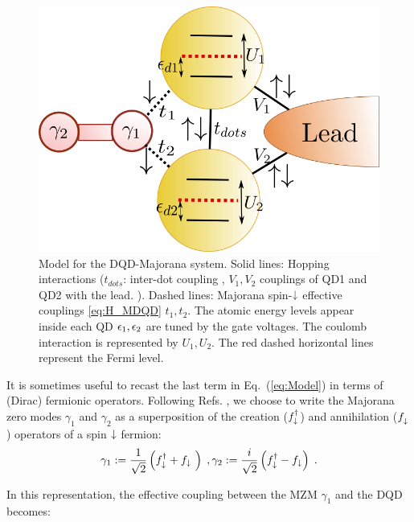 \documentclass[showpacs,aps,prb,reprint,superscriptaddress]{revtex4-2}
\begin{document}
\begin{figure}[t]
\begin{center}
\includegraphics[scale=0.4]{Graficos/GenModel.png}
\end{center}
\caption{ Model for the DQD-Majorana system. Solid lines: Hopping interactions ($t_{dots}$: inter-dot coupling , $V_1,V_2$ couplings of QD1 and QD2 with the lead. ). Dashed lines: Majorana spin-$\downarrow$ effective couplings \eqref{eq:H_MDQD} $t_1,t_2$. The atomic energy levels appear inside each QD $\epsilon_1, \epsilon_2$ are tuned by the gate voltages. The coulomb interaction is represented by $U_1,U_2$.  The red dashed horizontal lines represent the Fermi level.
}
%
\label{fig:GenModel}
\end{figure}

It is sometimes useful to recast the last term in Eq.\ (\ref{eq:Model}) in terms of (Dirac) fermionic operators. Following Refs. , we choose to write the Majorana zero modes $\gamma_1$ and $\gamma_2$ as a superposition of the creation ($f^{\dagger}_\downarrow$) and annihilation ($f^{ }_\downarrow$) operators of a spin $\downarrow$ fermion:
%
\begin{equation}
    \gamma_1 := \frac{1}{\sqrt{2}} \left( f^\dagger_{\downarrow} + f_{\downarrow}\ \right) \; , \gamma_2 := \frac{i}{\sqrt{2}} \left( f^\dagger_{\downarrow} - f_{\downarrow} \right) \; . \label{eq:MajOp}
\end{equation}


In this representation, the effective coupling between the MZM $\gamma_1$ and the DQD becomes:
\end{document}
